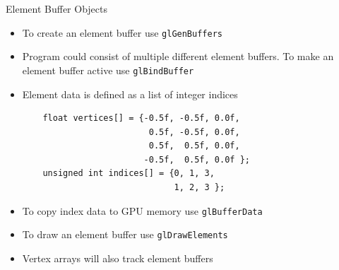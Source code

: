 \documentclass{beamer}
\begin{document}
\begin{frame}[fragile]{Element Buffer Objects}
    \begin{itemize}
        \item To create an element buffer use {\color{blue}\verb"glGenBuffers"}
        \item Program could consist of multiple different element buffers. To make an element buffer active use
            {\color{blue}\verb"glBindBuffer"}
        \item Element data is defined as a list of integer indices
 \begin{verbatim}
    float vertices[] = {-0.5f, -0.5f, 0.0f,
                         0.5f, -0.5f, 0.0f,
                         0.5f,  0.5f, 0.0f,
                        -0.5f,  0.5f, 0.0f };
    unsigned int indices[] = {0, 1, 3,
                              1, 2, 3 };
 \end{verbatim}
        \item To copy index data to GPU memory use {\color{blue}\verb"glBufferData"}
        \item To draw an element buffer use {\color{blue}\verb"glDrawElements"}
        \item Vertex arrays will also track element buffers
    \end{itemize}
\end{frame}
\end{document}
